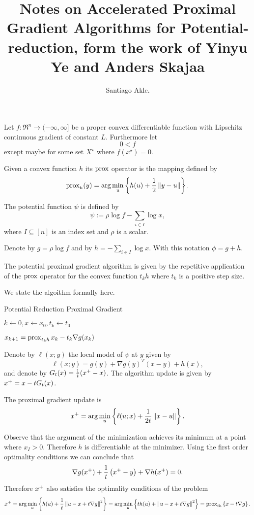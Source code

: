 \documentclass[smallextended]{article}       %
\title{Notes on Accelerated Proximal Gradient Algorithms for Potential-reduction, form the
work of Yinyu Ye and Anders Skajaa}
\author{
   Santiago Akle.
}
\begin{document}
\maketitle

Let $f:\Re^n\to(-\infty,\infty]$ be a proper convex differentiable function
with Lipschitz continuous gradient of constant $L$. Furthermore let
\[0 < f\] except maybe for some set $X^{\star}$ where $f(x^\star) = 0$.

Given a convex function $h$ its $\operatorname{prox}$ operator is the mapping defined by
\[
\operatorname{prox}_{h}(y) = \arg \min_u\left\{h(u) + \frac{1}{2}\left\| y-u \right\|\right\}.
\]

The potential function $\psi$ is defined by
\[
\psi := \rho \log{f} - \sum_{i\in I}\log{x},
\]
where $I\subseteq [n]$ is an index set and $\rho$ is a scalar.

Denote by
$g = \rho \log{f}$ and by $h = -\sum_{i\in I} \log{x}$. 
With this notation $\phi = g+h$.

The potential proximal gradient algorithm is given by the repetitive application
of the $\operatorname{prox}$ operator for the convex function $t_kh$ where $t_k$ is a
positive step size.

We state the algoithm formally here.

\begin{algorithm}
  \caption{Potential Reduction Proximal Gradient}
  \begin{algorithmic}
  \STATE $k \gets 0, x \gets x_0, t_k \gets t_0$

    \STATE $x_{k+1} = \operatorname{prox}_{t_kh}{x_k - t_k \nabla g(x_k)}$
  \ENDWHILE
  \end{algorithmic}
  \label{alg:ppg}
\end{algorithm}


Denote by $\ell(x;y)$ the local model of $\psi$ at $y$ given by
\[
\ell(x;y) = g(y) + \nabla g(y)^T(x-y) +  h(x),
\]
and denote by $G_t(x) = \frac{1}{t}(x^+ - x)$. 
The algorithm update is given by $x^+ = x-tG_t(x)$.

\begin{clm}
The proximal gradient update is 
\[
    x^+ = \arg \min_u\left\{ \ell(u;x) + \frac{1}{2t}\left\| x-u \right\| \right\}.
\] 
\end{clm}

\begin{prf}
  Observe that the argument of the minimization achieves its minimum at a 
  point where $x_I>0$. Therefore $h$ is differentiable at the minimizer.
  Using the first order optimality conditions we can conclude that
  \[
  \nabla g(x^+) + \frac{1}{t}\left( x^+ - y \right) + \nabla h(x^+)= 0.
  \]
  Therefore $x^+$ also satisfies the optimality conditions of the problem 
  \[
  x^+ = \arg \min_u \left\{ h(u) + \frac{1}{t}\left\| u - x + t\nabla g \right\|^2 \right\} 
      = \arg \min_u\left\{ th(u) + \left\| u - x + t\nabla g \right\|^2 \right\} 
      = \operatorname{prox}_{th}\left\{ x - t\nabla g \right\}.
  \] 
\end{prf}
\end{document}
